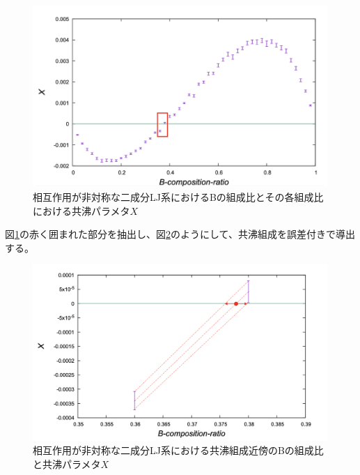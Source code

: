 \documentclass[titlepage]{jsreport}
\begin{document}
\begin{figure}[htbp]
    \begin{center}
        \includegraphics[width=14cm]{fig/bi-asymmetric-b/L100T1.0E1.05.pdf}
    \end{center}
    \caption{相互作用が非対称な二成分LJ系におけるBの組成比とその各組成比における共沸パラメタ$X$}
    \label{fig:bi-asymmetric-b}
\end{figure}

\newpage
図\ref{fig:bi-asymmetric-b}の赤く囲まれた部分を抽出し、図\ref{fig:bi-asymmetric-b-part}のようにして、共沸組成を誤差付きで導出する。

\begin{figure}[htbp]
    \begin{center}
        \includegraphics[width=14cm]{fig/bi-asymmetric-b-part/L100T1.0E1.05.pdf}
    \end{center}
    \caption{相互作用が非対称な二成分LJ系における共沸組成近傍のBの組成比と共沸パラメタ$X$}
    \label{fig:bi-asymmetric-b-part}
\end{figure}
\end{document}
